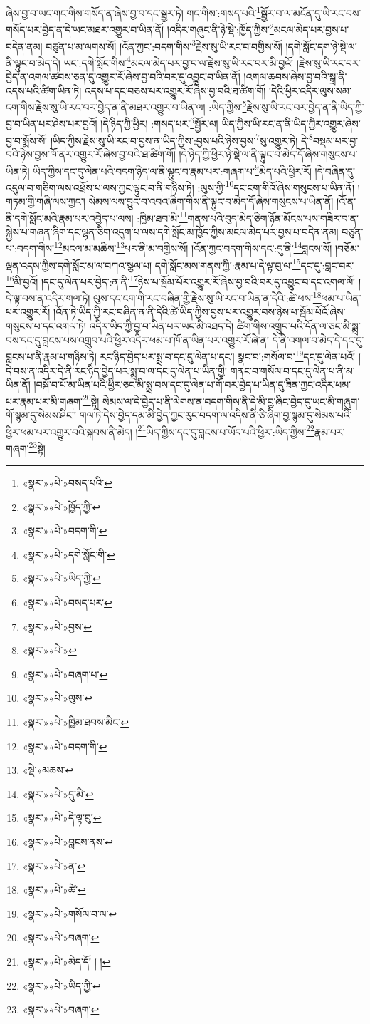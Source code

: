 ཞེས་བྱ་བ་ཡང་གང་གིས་གསོད་ན་ཞེས་བྱ་བ་དང་སྦྱར་ཏེ། གང་གིས་:གསད་པའི་\footnote{«སྣར་»«པེ་»བསད་པའི་}སྦྱོར་བ་ལ་མངོན་དུ་ཡི་རང་བས་གསོད་པར་བྱེད་ན་དེ་ཡང་མཐར་འགྱུར་བ་ཡིན་ནོ། །འདིར་གཞུང་ནི་ཉེ་སྡེ་:ཁྱོད་ཀྱིས་\footnote{«སྣར་»«པེ་»ཁྱོད་ཀྱི་}མངལ་མེད་པར་བྱས་པ་བདེན་ནམ། བཙུན་པ་མ་ལགས་སོ། །འོན་ཀྱང་:བདག་གིས་\footnote{«སྣར་»«པེ་»བདག་གི་}རྗེས་སུ་ཡི་རང་བ་བགྱིས་སོ། །དགེ་སློང་དག་ཉེ་སྡེ་ལ་ནི་ལྟུང་བ་མེད་དེ། ཡང་:དགེ་སློང་གིས་\footnote{«སྣར་»«པེ་»དགེ་སློང་གི་}མངལ་མེད་པར་བྱ་བ་ལ་རྗེས་སུ་ཡི་རང་བར་མི་བྱའོ། །རྗེས་སུ་ཡི་རང་བར་བྱེད་ན་འགལ་ཚབས་ཅན་དུ་འགྱུར་རོ་ཞེས་བྱ་བའི་བར་དུ་འབྱུང་བ་ཡིན་ནོ། །འགལ་ཆབས་ཞེས་བྱ་བའི་སྒྲ་ནི་འདས་པའི་ཚིག་ཡིན་ཏེ། འདས་པ་དང་བཅས་པར་འགྱུར་རོ་ཞེས་བྱ་བའི་ཐ་ཚིག་གོ། །དེའི་ཕྱིར་འདིར་ལུས་སམ་ངག་གིས་རྗེས་སུ་ཡི་རང་བར་བྱེད་ན་ནི་མཐར་འགྱུར་བ་ཡིན་ལ། :ཡིད་ཀྱིས་\footnote{«སྣར་»«པེ་»ཡིད་ཀྱི་}རྗེས་སུ་ཡི་རང་བར་བྱེད་ན་ནི་ཡིད་ཀྱི་བྱ་བ་ཡིན་པར་ཤེས་པར་བྱའོ། །དེ་ཉིད་ཀྱི་ཕྱིར། :གསད་པར་\footnote{«སྣར་»«པེ་»བསད་པར་}སྦྱོར་ལ། ཡིད་ཀྱིས་ཡི་རང་ན་ནི་ཡིད་ཀྱིར་འགྱུར་ཞེས་བྱ་བ་སྨོས་སོ། །ཡིད་ཀྱིས་རྗེས་སུ་ཡི་རང་བ་བྱས་ན་ཡིད་ཀྱིས་:བྱས་པའི་ཉེས་བྱས་\footnote{«སྣར་»«པེ་»བྱས་}སུ་འགྱུར་ཏེ། དེ་\footnote{«སྣར་»«པེ་»}བསྡམ་པར་བྱ་བའི་ཉེས་བྱས་ཁོ་ནར་འགྱུར་རོ་ཞེས་བྱ་བའི་ཐ་ཚིག་གོ། །དེ་ཉིད་ཀྱི་ཕྱིར་ཉེ་སྡེ་ལ་ནི་ལྟུང་བ་མེད་དོ་ཞེས་གསུངས་པ་ཡིན་ཏེ། ཡིད་ཀྱིས་དང་དུ་ལེན་པའི་བདག་ཉིད་ལ་ནི་ལྟུང་བ་རྣམ་པར་:གཞག་པ་\footnote{«སྣར་»«པེ་»བཞག་པ་}མེད་པའི་ཕྱིར་རོ། །དེ་བཞིན་དུ་འདུལ་བ་གཅིག་ལས་འཕྲོས་པ་ལས་ཀྱང་ལྟུང་བ་ནི་གཉིས་ཏེ། :ལུས་ཀྱི་\footnote{«སྣར་»«པེ་»ལུས་}དང་ངག་གིའོ་ཞེས་གསུངས་པ་ཡིན་ནོ། །གཏམ་གྱི་གཞི་ལས་ཀྱང་། སེམས་ལས་བྱུང་བ་འབའ་ཞིག་གིས་ནི་ལྟུང་བ་མེད་དོ་ཞེས་གསུངས་པ་ཡིན་ནོ། །འོ་ན་ནི་དགེ་སློང་མའི་རྣམ་པར་འབྱེད་པ་ལས། :ཁྱིམ་ཐབ་མི་\footnote{«སྣར་»«པེ་»ཁྱིམ་ཐབས་མིང་}གནས་པའི་བུད་མེད་ཅིག་ཉོན་མོངས་པས་གཟིར་བ་ན་སྐྱེས་པ་གཞན་ཞིག་དང་ལྷན་ཅིག་འདུག་པ་ལས་དགེ་སློང་མ་ཁྱོད་ཀྱིས་མངལ་མེད་པར་བྱས་པ་བདེན་ནམ། བཙུན་པ་:བདག་གིས་\footnote{«སྣར་»«པེ་»བདག་གི་}མངལ་མ་མཆིས་\footnote{«སྡེ་»མཆས་}པར་ནི་མ་བགྱིས་སོ། །འོན་ཀྱང་བདག་གིས་དང་:དུ་ནི་\footnote{«སྣར་»«པེ་»དུ་མི་}བླངས་སོ། །བཅོམ་ལྡན་འདས་ཀྱིས་དགེ་སློང་མ་ལ་བཀའ་སྩལ་པ། དགེ་སློང་མས་གནས་ཀྱི་:རྣམ་པ་དེ་ལྟ་བུ་ལ་\footnote{«སྣར་»«པེ་»དེ་ལྟ་བུ་}དང་དུ་:བླང་བར་\footnote{«སྣར་»«པེ་»བླངས་ནས་}མི་བྱའོ། །དང་དུ་ལེན་པར་བྱེད་:ན་ནི་\footnote{«སྣར་»«པེ་»ན་}ཉེས་པ་སྦོམ་པོར་འགྱུར་རོ་ཞེས་བྱ་བའི་བར་དུ་འབྱུང་བ་དང་འགལ་ལོ། །དེ་ལྟ་བས་ན་འདིར་གལ་ཏེ། ལུས་དང་ངག་གི་རང་བཞིན་གྱི་རྗེས་སུ་ཡི་རང་བ་ཡིན་ན་དེའི་:ཚེ་ཕས་\footnote{«སྣར་»«པེ་»ཚེ་}ཕམ་པ་ཡིན་པར་འགྱུར་རོ། །འོན་ཏེ་ཡིད་ཀྱི་རང་བཞིན་ན་ནི་དེའི་ཚེ་ཡིད་ཀྱིས་བྱས་པར་འགྱུར་བས་ཉེས་པ་སྦོམ་པོའོ་ཞེས་གསུངས་པ་དང་འགལ་ཏེ། འདིར་ཡིད་ཀྱི་བྱ་བ་ཡིན་པར་ཡང་མི་འཐད་དེ། ཚིག་གིས་འགྲུབ་པའི་དོན་ལ་ཅང་མི་སྨྲ་བས་དང་དུ་བླངས་པས་འགྲུབ་པའི་ཕྱིར་འདིར་ཕམ་པ་ཁོ་ན་ཡིན་པར་འགྱུར་རོ་ཞེ་ན། དེ་ནི་འགལ་བ་མེད་དེ་དང་དུ་བླངས་པ་ནི་རྣམ་པ་གཉིས་ཏེ། རང་ཉིད་བྱེད་པར་སྨྲ་བ་དང་དུ་ལེན་པ་དང་། སྣང་བ་:གསོལ་བ་\footnote{«སྣར་»«པེ་»གསོལ་བ་ལ་}དང་དུ་ལེན་པའོ། །དེ་བས་ན་འདིར་དེ་ནི་རང་ཉིད་བྱེད་པར་སྨྲ་བ་ལ་དང་དུ་ལེན་པ་ཡིན་གྱི། གནང་བ་གསོལ་བ་དང་དུ་ལེན་པ་ནི་མ་ཡིན་ནོ། །བསྐོ་བ་པོ་མ་ཡིན་པའི་ཕྱིར་ཅང་མི་སྨྲ་བས་དང་དུ་ལེན་པ་གོ་བར་བྱེད་པ་ཡིན་དུ་ཟིན་ཀྱང་འདིར་ཕམ་པར་རྣམ་པར་མི་གཞག་\footnote{«སྣར་»«པེ་»བཞག་}སྟེ། སེམས་ལ་དེ་བྱེད་པ་ནི་ལེགས་ན་བདག་གིས་ནི་དེ་མི་བྱ་ཞིང་བྱེད་དུ་ཡང་མི་གཞུག་གོ་སྙམ་དུ་སེམས་ཤིང་། གལ་ཏེ་དེས་བྱེད་དམ་མི་བྱེད་ཀྱང་རུང་བདག་ལ་འདིས་ནི་ཅི་ཞིག་བྱ་སྙམ་དུ་སེམས་པའི་ཕྱིར་ཕམ་པར་འགྱུར་བའི་སྐབས་ནི་མེད། །\footnote{«སྣར་»«པེ་»མེད་དོ། ། །}ཡིད་ཀྱིས་དང་དུ་བླངས་པ་ཡོད་པའི་ཕྱིར་:ཡིད་ཀྱིས་\footnote{«སྣར་»«པེ་»ཡིད་ཀྱི་}རྣམ་པར་གཞག་\footnote{«སྣར་»«པེ་»བཞག་}སྟེ། 